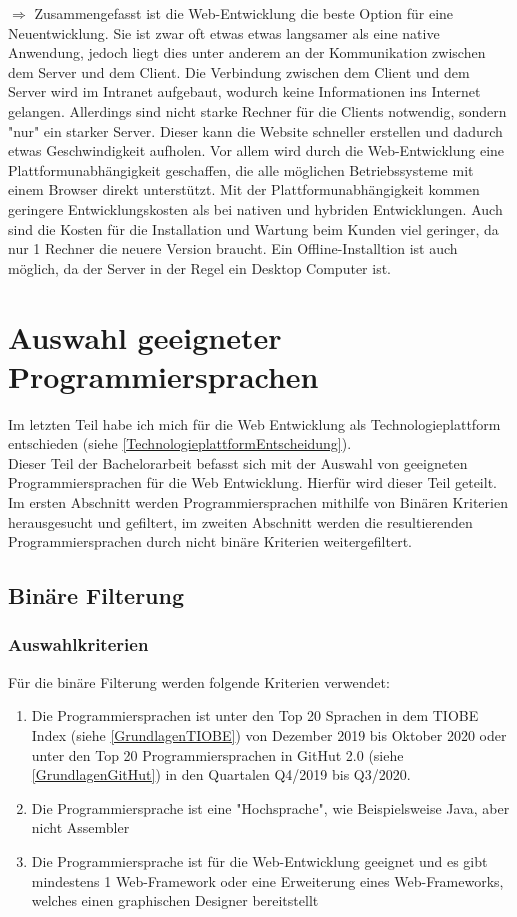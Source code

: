\documentclass[ngerman]{article}
\begin{document}
    \indent$\Rightarrow$ Zusammengefasst ist die Web-Entwicklung die beste Option für eine Neuentwicklung. Sie ist zwar oft etwas etwas langsamer als eine native Anwendung, jedoch liegt dies unter anderem an der Kommunikation zwischen dem Server und dem Client. Die Verbindung zwischen dem Client und dem Server wird im Intranet aufgebaut, wodurch keine Informationen ins Internet gelangen. Allerdings sind nicht starke Rechner für die Clients notwendig, sondern "nur" ein starker Server. Dieser kann die Website schneller erstellen und dadurch etwas Geschwindigkeit aufholen. Vor allem wird durch die Web-Entwicklung eine Plattformunabhängigkeit geschaffen, die alle möglichen Betriebssysteme mit einem Browser direkt unterstützt. Mit der Plattformunabhängigkeit kommen geringere Entwicklungskosten als bei nativen und hybriden Entwicklungen. Auch sind die Kosten für die Installation und Wartung beim Kunden viel geringer, da nur 1 Rechner die neuere Version braucht. Ein Offline-Installtion ist auch möglich, da der Server in der Regel ein Desktop Computer ist.
    \newpage\noindent
    \section{Auswahl geeigneter Programmiersprachen}
    \label{AuswahlProgrammiersprachen}
    Im letzten Teil habe ich mich für die Web Entwicklung als Technologieplattform entschieden (siehe \ref{TechnologieplattformEntscheidung}).\\
    Dieser Teil der Bachelorarbeit befasst sich mit der Auswahl von geeigneten Programmiersprachen für die Web Entwicklung. Hierfür wird dieser Teil geteilt. Im ersten Abschnitt werden Programmiersprachen mithilfe von Binären Kriterien herausgesucht und gefiltert, im zweiten Abschnitt werden die resultierenden Programmiersprachen durch nicht binäre Kriterien weitergefiltert.
    \subsection{Binäre Filterung}
    \subsubsection{Auswahlkriterien}
    Für die binäre Filterung werden folgende Kriterien verwendet:
    \begin{enumerate}
        \item Die Programmiersprachen ist unter den Top 20 Sprachen in dem TIOBE Index (siehe \ref{GrundlagenTIOBE}) von Dezember 2019 bis Oktober 2020 oder unter den Top 20 Programmiersprachen in GitHut 2.0 (siehe \ref{GrundlagenGitHut}) in den Quartalen Q4/2019 bis Q3/2020.
        \item Die Programmiersprache ist eine "Hochsprache", wie Beispielsweise Java, aber nicht Assembler
        \item Die Programmiersprache ist für die Web-Entwicklung geeignet und es gibt mindestens 1 Web-Framework oder eine Erweiterung eines Web-Frameworks, welches einen graphischen Designer bereitstellt
    \end{enumerate}
\end{document}
